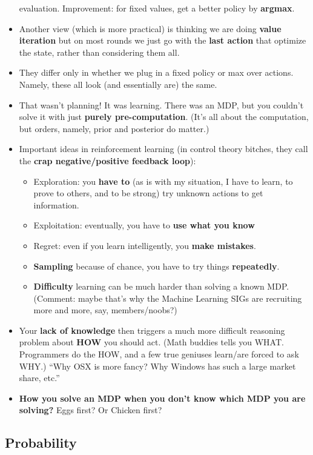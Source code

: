 \documentclass[twocolumn]{article}
\begin{document}
\begin{itemize}
  evaluation. Improvement: for fixed values, get a better policy by
  \textbf{argmax}. 
\item Another view (which is more practical) is thinking we are doing
  \textbf{value iteration} but on most rounds we just go with the \textbf{last
    action} that optimize the state, rather than considering them all.
\item They differ only in whether we plug in a fixed policy or max
  over actions. Namely, these all look (and essentially are) the same.
\item That wasn't planning! It was learning. There was an MDP, but you
  couldn't solve it with just \textbf{purely pre-computation}. (It's
  all about the computation, but orders, namely, prior and posterior
  do matter.)
\item Important ideas in reinforcement learning (in control theory
  bitches, they call the \textbf{crap negative/positive feedback
    loop}): 
  \begin{itemize}
  \item Exploration: you \textbf{have to} (as is with my situation, I
    have to learn, to prove to others, and to be strong) try unknown
    actions to get information.
  \item Exploitation: eventually, you have to \textbf{use what you
      know}
  \item Regret: even if you learn intelligently, you \textbf{make
      mistakes}. 
  \item \textbf{Sampling} because of chance, you have to try things
    \textbf{repeatedly}. 
  \item \textbf{Difficulty} learning can be much harder than solving a
    known MDP. (Comment: maybe that's why the Machine Learning SIGs
    are recruiting more and more, say, members/noobs?)
  \end{itemize}
\item Your \textbf{lack of knowledge} then triggers a much more
  difficult reasoning problem about \textbf{HOW} you should act. (Math
  buddies tells you WHAT. Programmers do the HOW, and a few true
  geniuses learn/are forced to ask WHY.) ``Why OSX is more fancy? Why
  Windows has such a large market share, etc.''
\item \textbf{How you solve an MDP when you don't know which MDP you
    are solving?} Eggs first? Or Chicken first?
\end{itemize}

\subsection{Probability}
\label{sec:probability}
\end{document}

